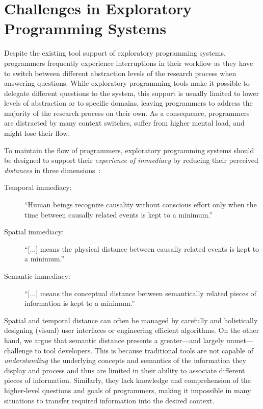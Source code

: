 
\section{Challenges in Exploratory Programming Systems}
\label{sec:background/challenges}

Despite the existing tool support of exploratory programming systems, programmers frequently experience interruptions in their workflow as they have to switch between different abstraction levels of the research process when answering questions.
While exploratory programming tools make it possible to delegate different questions to the system, this support is usually limited to lower levels of abstraction or to specific domains, leaving programmers to address the majority of the research process on their own.
As a consequence, programmers are distracted by many context switches, suffer from higher mental load, and might lose their flow.

To maintain the flow of programmers, exploratory programming systems should be designed to support their \emph{experience of immediacy} by reducing their perceived \emph{distances} in three dimensions~\cite{ungar1997debugging}:

\begin{description}
	\item[Temporal immediacy:] ``Human beings recognize causality without conscious effort only when the time between causally related events is kept to a minimum.''
	\item[Spatial immediacy:] ``[...] means the physical distance between causally related events is kept to a minimum.''
	\item[Semantic immediacy:] ``[...] means the conceptual distance between semantically related pieces of information is kept to a minimum.''
\end{description}

Spatial and temporal distance can often be managed by carefully and holistically designing (visual) user interfaces or engineering efficient algorithms.
On the other hand, we argue that semantic distance presents a greater---and largely unmet---challenge to tool developers.
This is because traditional tools are not capable of \emph{understanding} the underlying concepts and semantics of the information they display and process and thus are limited in their ability to associate different pieces of information.
Similarly, they lack knowledge and comprehension of the higher-level questions and goals of programmers, making it impossible in many situations to transfer required information into the desired context.

